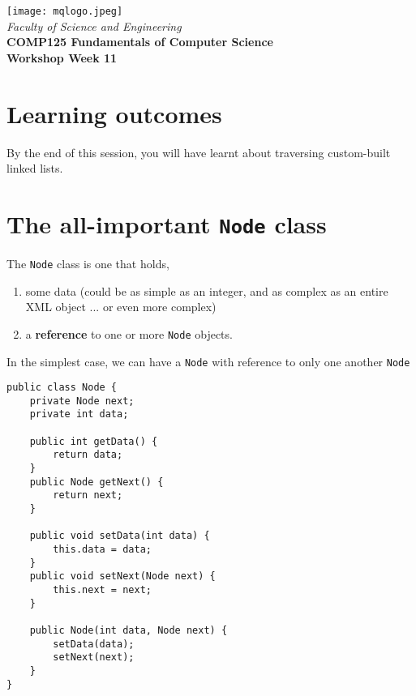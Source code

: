 \documentclass{exam}
\begin{document}

%
\vspace{0.2in}
\begin{center}
        {\large  %
\texttt{[image: mqlogo.jpeg]}\\
\medskip
        {\it  Faculty of Science and Engineering\\}
        \vspace{0.2in}
         {\bf COMP125 Fundamentals of Computer Science\\
        Workshop Week 11\\}}
\end{center}
\vspace{0.3in}
%

\renewcommand{\labelenumi}{\alph{enumi}.}
 
\section* {Learning outcomes}

By the end of this session, you will have learnt about traversing custom-built linked lists. 

\section*{The all-important \texttt{Node} class}
The \texttt{Node} class is one that holds,

\begin{enumerate}
\item  some data (could be as simple as an integer, and as complex as an entire XML object ... or even more complex)
\item a \textbf{reference} to one or more \texttt{Node} objects.	
\end{enumerate}

In the simplest case, we can have a \texttt{Node} with reference to only one another \texttt{Node}

\begin{lstlisting}
public class Node {
	private Node next;
	private int data;
	
	public int getData() {
		return data;
	}
	public Node getNext() {
		return next;
	}
	
	public void setData(int data) {
		this.data = data;
	}
	public void setNext(Node next) {
		this.next = next;
	}
	
	public Node(int data, Node next) {
		setData(data);
		setNext(next);
	}
}
\end{lstlisting}
\end{document}
